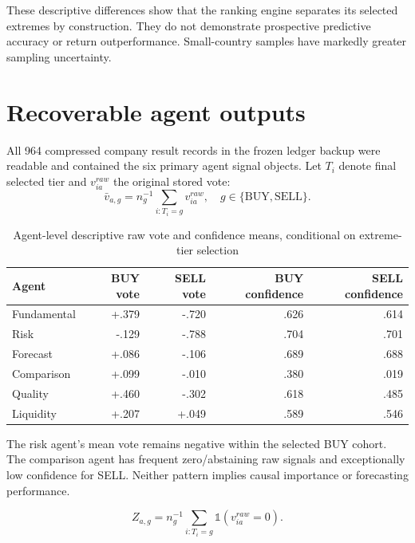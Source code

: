\documentclass[11pt,a4paper]{article}
\begin{document}
These descriptive differences show that the ranking engine separates its selected extremes by construction. They do not demonstrate prospective predictive accuracy or return outperformance. Small-country samples have markedly greater sampling uncertainty.

\section{Recoverable agent outputs}
All 964 compressed company result records in the frozen ledger backup were readable and contained the six primary agent signal objects. Let $T_i$ denote final selected tier and $v_{ia}^{raw}$ the original stored vote:
\begin{equation}
\bar v_{a,g} = n_g^{-1}\sum_{i:T_i=g}v_{ia}^{raw},
\quad g\in\{\mathrm{BUY},\mathrm{SELL}\}.
\label{eq:rawmeans}
\end{equation}

\begin{table}[ht]
\centering\small
\caption{Agent-level descriptive raw vote and confidence means, conditional on extreme-tier selection}
\begin{tabular}{lrrrr}\toprule
Agent & BUY vote & SELL vote & BUY confidence & SELL confidence\\\midrule
Fundamental & +.379 & -.720 & .626 & .614\\
Risk & -.129 & -.788 & .704 & .701\\
Forecast & +.086 & -.106 & .689 & .688\\
Comparison & +.099 & -.010 & .380 & .019\\
Quality & +.460 & -.302 & .618 & .485\\
Liquidity & +.207 & +.049 & .589 & .546\\\bottomrule
\end{tabular}
\label{tab:agents}
\end{table}

The risk agent's mean vote remains negative within the selected BUY cohort. The comparison agent has frequent zero/abstaining raw signals and exceptionally low confidence for SELL. Neither pattern implies causal importance or forecasting performance.

\begin{equation}
Z_{a,g}=n_g^{-1}\sum_{i:T_i=g}\mathbb{1}\!\left(v_{ia}^{raw}=0\right).
\label{eq:abstention}
\end{equation}
\end{document}
